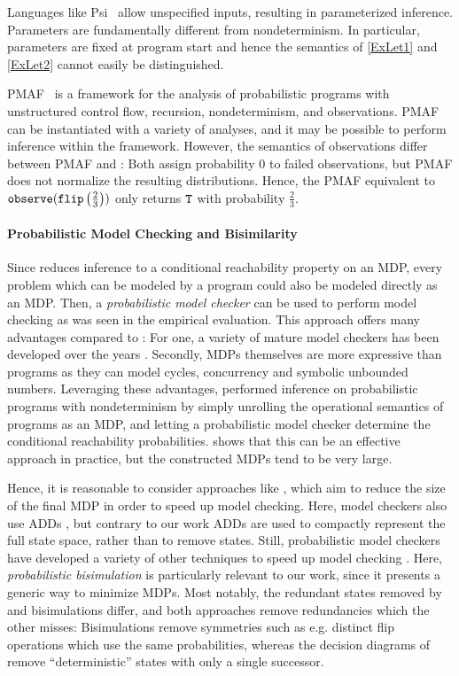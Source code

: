 Languages like Psi~\cite{gehr2020lambdapsi} allow unspecified inputs, resulting in parameterized inference.
Parameters are fundamentally different from nondeterminism.
In particular, parameters are fixed at program start and hence the semantics of \ref{ExLet1} and \ref{ExLet2} cannot easily be distinguished.

PMAF~\cite{wang2018pmaf} is a framework for the analysis of probabilistic programs with unstructured control flow, recursion, nondeterminism, and observations.
PMAF can be instantiated with a variety of analyses, and it may be possible to perform \NDICE inference within the framework. 
However, the semantics of observations differ between PMAF and \NDICE \cite{wang2018denotational}:
Both assign probability $0$ to failed observations, but PMAF does not normalize the resulting distributions.
Hence, the PMAF equivalent to $\textnormal{\texttt{observe}} (\texttt{flip} \left(\frac{2}{3}\right) )$ only returns $\texttt{T}$ with probability $\frac{2}{3}$.

\paragraph{Probabilistic Model Checking and Bisimilarity}
Since \NDICE reduces inference to a conditional reachability property on an MDP, every problem which can be modeled by a \NDICE program could also be modeled directly as an MDP.
Then, a \textit{probabilistic model checker} can be used to perform model checking as was seen in the empirical evaluation.
This approach offers many advantages compared to \NDICE:
For one, a variety of mature model checkers has been developed over the years \cite{hahn20192019}.
Secondly, MDPs themselves are more expressive than \NDICE programs as they can model cycles, concurrency and symbolic unbounded numbers.
Leveraging these advantages, \citet{jansen2016bounded} performed inference on probabilistic programs with nondeterminism by simply unrolling the operational semantics of programs as an MDP, and letting a probabilistic model checker determine the conditional reachability probabilities.
 shows that this can be an effective approach in practice, but the constructed MDPs tend to be very large.

Hence, it is reasonable to consider approaches like \NDICE, which aim to reduce the size of the final MDP in order to speed up model checking.
Here, model checkers also use ADDs \cite{baier1997symbolic}, but contrary to our work ADDs are used to compactly represent the full state space, rather than to remove states.
Still, probabilistic model checkers have developed a variety of other techniques to speed up model checking \cite{hartmanns2025revised}.
Here, \emph{probabilistic bisimulation} \cite{larsen1989bisimulation, segala1995probabilistic} is particularly relevant to our work, since it presents a generic way to minimize MDPs.
Most notably, the redundant states removed by \NDICE and bisimulations differ, and both approaches remove redundancies which the other misses:
Bisimulations remove symmetries such as e.g. distinct flip operations which use the same probabilities, whereas the decision diagrams of \NDICE remove \enquote{deterministic} states with only a single successor.

